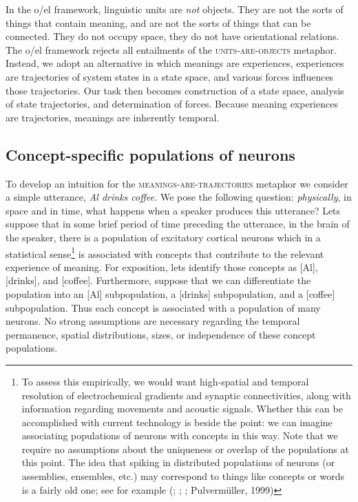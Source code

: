   In the o/el framework, linguistic units are \textit{not} objects. They are not the sorts of things that contain meaning, and are not the sorts of things that can be connected. They do not occupy space, they do not have orientational relations. The o/el framework rejects all entailments of the \textsc{units}\textsc{{}-are-}\textsc{objects} metaphor. Instead, we adopt an alternative in which meanings are experiences, experiences are trajectories of system states in a state space, and various forces influences those trajectories. Our task then becomes construction of a state space, analysis of state trajectories, and determination of forces. Because meaning experiences are trajectories, meanings are inherently temporal. 

\subsection{Concept-specific populations of neurons}

To develop an intuition for the \textsc{meanings}\textsc{{}-are-}\textsc{trajectories} metaphor we consider a simple utterance, \textit{Al drinks coffee.} We pose the following question: \textit{physically}, in space and in time, what happens when a speaker produces this utterance? Lets suppose that in some brief period of time preceding the utterance, in the brain of the speaker, there is a population of excitatory cortical neurons which in a statistical sense\footnote{To assess this empirically, we would want high-spatial and temporal resolution of electrochemical gradients and synaptic connectivities, along with information regarding movements and acoustic signals. Whether this can be accomplished with current technology is beside the point: we can imagine associating populations of neurons with concepts in this way. Note that we require no assumptions about the uniqueness or overlap of the populations at this point. The idea that spiking in distributed populations of neurons (or assemblies, ensembles, etc.) may correspond to things like concepts or words is a fairly old one; see for example (\citealt{Abeles2012}; \citealt{Braitenberg1978}; \citealt{Hebb1949}; Pulvermüller, 1999)} is associated with concepts that contribute to the relevant experience of meaning. For exposition, lets identify those concepts as [Al], [drinks], and [coffee]. Furthermore, suppose that we can differentiate the population into an [Al] subpopulation, a [drinks] subpopulation, and a [coffee] subpopulation. Thus each concept is associated with a population of many neurons. No strong assumptions are necessary regarding the temporal permanence, spatial distributions, sizes, or independence of these concept populations.

